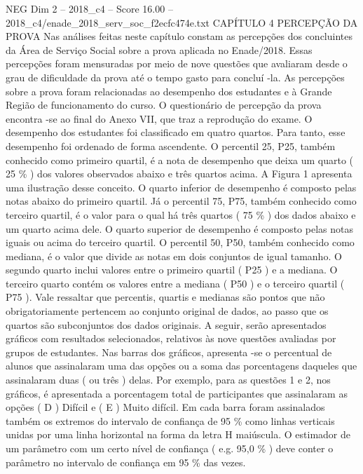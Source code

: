 \begin{textsample}{NEG Dim 2 – 2018\_c4 – Score 16.00 – 2018\_c4/enade\_2018\_serv\_soc\_f2ecfc474e.txt}  \label{ex:f2_neg_382}
CAPÍTULO 4 PERCEPÇÃO DA PROVA Nas análises feitas neste capítulo constam as percepções dos concluintes da Área de Serviço Social sobre a prova aplicada no Enade/2018.
Essas percepções foram mensuradas por meio de nove questões que avaliaram desde o grau de dificuldade da prova até o tempo gasto para concluí -la.
As percepções sobre a prova foram relacionadas ao desempenho dos estudantes e à Grande Região de funcionamento do curso.
O questionário de percepção da prova encontra -se ao final do Anexo VII, que traz a reprodução do exame.
O desempenho dos estudantes foi classificado em quatro quartos.
Para tanto, esse desempenho foi ordenado de forma ascendente.
O percentil 25, P25, também conhecido como primeiro quartil, é a nota de desempenho que deixa um quarto ( 25 \% ) dos valores observados abaixo e três quartos acima.
A Figura 1 apresenta uma ilustração desse conceito.
O quarto inferior de desempenho é composto pelas notas abaixo do primeiro quartil.
Já o percentil 75, P75, também conhecido como terceiro quartil, é o valor para o qual há três quartos ( 75 \% ) dos dados abaixo e um quarto acima dele.
O quarto superior de desempenho é composto pelas notas iguais ou acima do terceiro quartil.
O percentil 50, P50, também conhecido como mediana, é o valor que divide as notas em dois conjuntos de igual tamanho.
O segundo quarto inclui valores entre o primeiro quartil ( P25 ) e a mediana.
O terceiro quarto contém os valores entre a mediana ( P50 ) e o terceiro quartil ( P75 ).
Vale ressaltar que percentis, quartis e medianas são pontos que não obrigatoriamente pertencem ao conjunto original de dados, ao passo que os quartos são subconjuntos dos dados originais.
A seguir, serão apresentados gráficos com resultados selecionados, relativos às nove questões avaliadas por grupos de estudantes.
Nas barras dos gráficos, apresenta -se o percentual de alunos que assinalaram uma das opções ou a soma das porcentagens daqueles que assinalaram duas ( ou três ) delas.
Por exemplo, para as questões 1 e 2, nos gráficos, é apresentada a porcentagem total de participantes que assinalaram as opções ( D ) Difícil e ( E ) Muito difícil.
Em cada barra foram assinalados também os extremos do intervalo de confiança de 95 \% como linhas verticais unidas por uma linha horizontal na forma da letra H maiúscula.
O estimador de um parâmetro com um certo nível de confiança ( e.g. 95,0 \% ) deve conter o parâmetro no intervalo de confiança em 95 \% das vezes.

\end{textsample}
